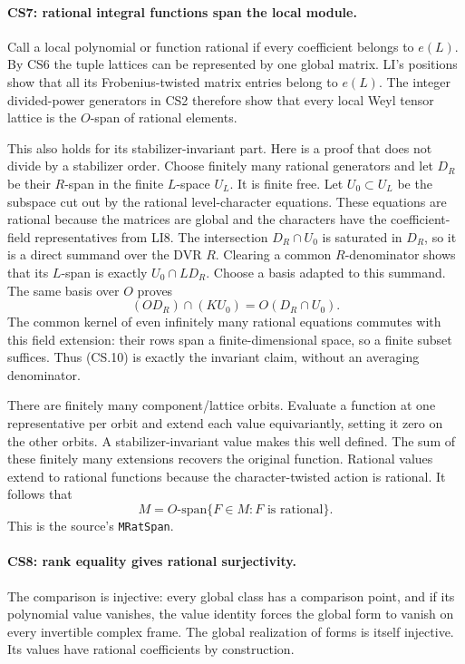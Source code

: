 \documentclass[11pt,a4paper]{article}
\numberwithin{equation}{section}
\theoremstyle{remark}\newtheorem{remark}[theorem]{Remark}
\begin{document}
\paragraph{CS7: rational integral functions span the local module.}
Call a local polynomial or function rational if every coefficient
belongs to $e(L)$. By CS6 the tuple lattices can be represented by one
global matrix. LI's positions show that all its Frobenius-twisted
matrix entries belong to $e(L)$. The integer divided-power generators
in CS2 therefore show that every local Weyl tensor lattice is the
$O$-span of rational elements.

This also holds for its stabilizer-invariant part. Here is a proof
that does not divide by a stabilizer order. Choose finitely many
rational generators and let $D_R$ be their $R$-span in the finite
$L$-space $U_L$. It is finite free. Let $U_0\subset U_L$ be the
subspace cut out by the rational level-character equations. These
equations are rational because the matrices are global and the
characters have the coefficient-field representatives from LI8.
The intersection $D_R\cap U_0$ is saturated in $D_R$, so it is a
direct summand over the DVR $R$. Clearing a common $R$-denominator
shows that its $L$-span is exactly $U_0\cap LD_R$. Choose a basis
adapted to this summand. The same basis over $O$ proves
\[
 (O D_R)\cap(K U_0)=O(D_R\cap U_0).                    \tag{CS.10}
\]
The common kernel of even infinitely many rational equations commutes
with this field extension: their rows span a finite-dimensional space,
so a finite subset suffices. Thus (CS.10) is exactly the invariant
claim, without an averaging denominator.

There are finitely many component/lattice orbits. Evaluate a function
at one representative per orbit and extend each value equivariantly,
setting it zero on the other orbits. A stabilizer-invariant value makes
this well defined. The sum of these finitely many extensions recovers
the original function. Rational values extend to rational functions
because the character-twisted action is rational. It follows that
\[
 M=O\text{-span}\{F\in M:F\text{ is rational}\}.        \tag{CS.11}
\]
This is the source's \texttt{MRatSpan}.

\paragraph{CS8: rank equality gives rational surjectivity.}
The comparison is injective: every global class has a comparison point,
and if its polynomial value vanishes, the value identity forces the
global form to vanish on every invertible complex frame. The global
realization of forms is itself injective. Its values have rational
coefficients by construction.
\end{document}
